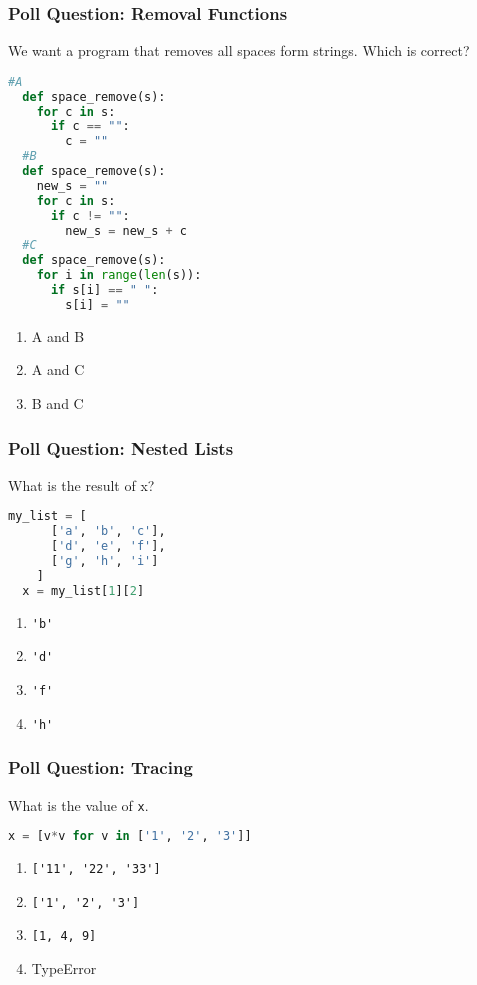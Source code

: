 \documentclass{beamer}
\begin{document}
%
%
\begin{frame}[fragile]
  \frametitle{Poll Question: Removal Functions}
  We want a program that removes all spaces form strings. Which is correct?\\
  \begin{minipage}{0.48\textwidth}
    \begin{lstlisting}[language=Python, autogobble]
  #A
  def space_remove(s):
    for c in s:
      if c == "":
        c = ""
  #B
  def space_remove(s):
    new_s = ""
    for c in s:
      if c != "":
        new_s = new_s + c
  #C
  def space_remove(s):
    for i in range(len(s)):
      if s[i] == " ":
        s[i] = ""
    \end{lstlisting}
  \end{minipage}
  \hfill
  \begin{minipage}{0.48\textwidth}
    \hfill
    \begin{enumerate}[A]
      \item A and B
      \item A and C
      \item B and C
    \end{enumerate}
  \end{minipage}
\end{frame}


%
%
\begin{frame}[fragile]
  \frametitle{Poll Question: Nested Lists}
  What is the result of x?
  \begin{lstlisting}[language=Python, autogobble]
  my_list = [
      ['a', 'b', 'c'],
      ['d', 'e', 'f'],
      ['g', 'h', 'i']
    ]
  x = my_list[1][2]
  \end{lstlisting}
  \vfill
  \begin{enumerate}[A]
    \item \lstinline|'b'|
    \item \lstinline|'d'|
    \item \lstinline|'f'|
    \item \lstinline|'h'|
  \end{enumerate}
\end{frame}

%
%
\begin{frame}[fragile]
  \frametitle{Poll Question: Tracing}
  What is the value of \lstinline|x|.
  \begin{lstlisting}[language=Python, autogobble]
  x = [v*v for v in ['1', '2', '3']]
  \end{lstlisting}
  \vfill
  \begin{enumerate}[A]
    \item \lstinline|['11', '22', '33']| 
    \item \lstinline|['1', '2', '3']|
    \item \lstinline|[1, 4, 9]|
    \item TypeError
  \end{enumerate}
\end{frame}
\end{document}
